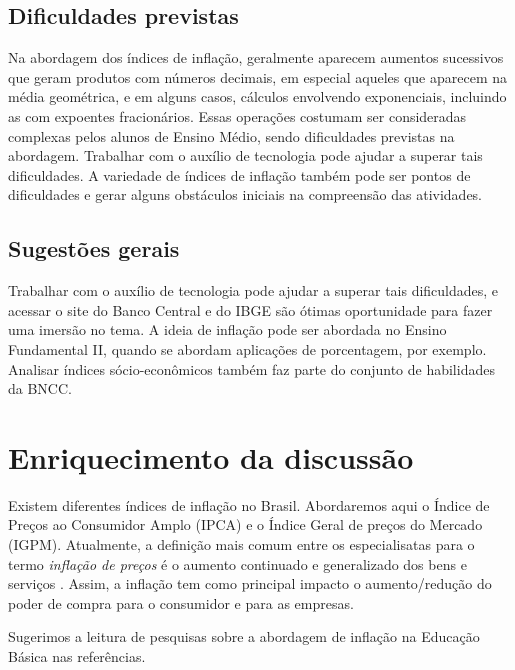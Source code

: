 \begin{paginatexto}
\subsection{Dificuldades previstas} Na abordagem dos índices de inflação, geralmente aparecem aumentos sucessivos que geram produtos com números decimais, em especial aqueles que aparecem na média geométrica, e em alguns casos, cálculos envolvendo exponenciais, incluindo as com expoentes fracionários. Essas operações costumam ser consideradas complexas pelos alunos de Ensino Médio, sendo dificuldades previstas na abordagem. Trabalhar com o auxílio de tecnologia pode ajudar a superar tais dificuldades. A variedade de índices de inflação também pode ser pontos de dificuldades e gerar alguns obstáculos iniciais na compreensão das atividades.

\subsection{Sugestões gerais} Trabalhar com o auxílio de tecnologia pode ajudar a superar tais dificuldades, e acessar o site do Banco Central e do IBGE são ótimas oportunidade para fazer uma imersão no tema. A ideia de inflação pode ser abordada no Ensino Fundamental II, quando se abordam aplicações de porcentagem, por exemplo. Analisar índices sócio-econômicos também faz parte do conjunto de habilidades da BNCC.

\section*{Enriquecimento da discussão}

Existem diferentes índices de inflação no Brasil. Abordaremos aqui o Índice de Preços ao Consumidor Amplo (IPCA) e o Índice Geral de preços do Mercado (IGPM). Atualmente, a definição mais comum entre os especialisatas para o termo \textit{inflação de preços} é o aumento continuado e generalizado dos bens e serviços \citep{ecb2017}. Assim, a inflação tem como principal impacto o aumento/redução do poder de compra para o consumidor e para as empresas.

Sugerimos a leitura de pesquisas sobre a abordagem de inflação na Educação Básica nas referências.
\end{paginatexto}


